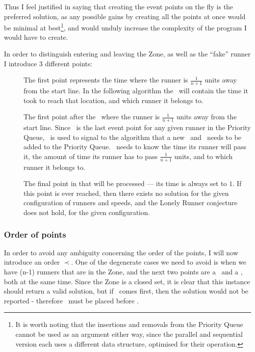 Thus I feel justified in saying that creating the event points on the fly is the preferred solution, as any possible gains by creating all the points at once would be minimal at best\footnote{It is worth noting that the insertions and removals from the Priority Queue cannot be used as an argument either way, since the parallel and sequential version each uses a different data structure, optimised for their operation.}, and would unduly increase the complexity of the program I would have to create. 

In order to distinguish entering and leaving the Zone, as well as the ``fake'' runner I introduce 3 different points:
\begin{description}
\item[\comStart] The first point represents the time where the runner is $\frac{1}{n + 1}$ units away from the start line. In the following algorithm the \comStart\, will contain the time it took to reach that location, and which runner it belongs to.
\item[\comEnd] The first point after the \comStart\, where the runner is $\frac{1}{n + 1}$ units away from the start line. Since \comEnd\, is the last event point for any given runner in the Priority Queue, \comEnd\, is used to signal to the algorithm that a new \comStart\, and \comEnd\, needs to be added to the Priority Queue. \comEnd\, needs to know the time its runner will pass it, the amount of time its runner has to pass $\frac{1}{n+1}$ units, and to which runner it belongs to.
\item[\comFin] The final point in that will be processed --- its time is always set to $1$. If this point is ever reached, then there exists no solution for the given configuration of runners and speeds, and the Lonely Runner conjecture does not hold, for the given configuration.
\end{description}

\subsubsection{Order of points}
In order to avoid any ambiguity concerning the order of the points, I will now introduce an order $\prec$. One of the degenerate cases we need to avoid is when we have (n-1) runners that are in the Zone, and the next two points are a \comEnd\, and a \comStart, both at the same time. Since the Zone is a closed set, it is clear that this instance should return a valid solution, but if \comEnd\, comes first, then the solution would not be reported - therefore \comStart\, must be placed before \comEnd. 

